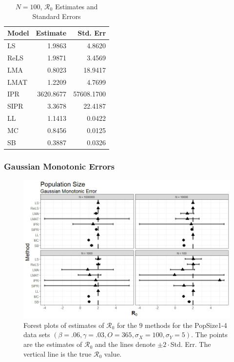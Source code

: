 \documentclass[12pt]{article}
\newcommand{\xxsir}{\ensuremath{9} } %
\newcommand{\rr}{\ensuremath{\mathcal{R}_0}}
\begin{document}
\begin{table}[H]
	
	\centering
	\begin{tabular}[t]{l|r|r}
		\hline
		Model & Estimate & Std. Err\\
		\hline
		LS & 1.9863 & 4.8620\\
		\hline
		ReLS & 1.9871 & 3.4569\\
		\hline
		LMA & 0.8023 & 18.9417\\
		\hline
		LMAT & 1.2209 & 4.7699\\
		\hline
		IPR & 3620.8677 & 57608.1700\\
		\hline
		SIPR & 3.3678 & 22.4187\\
		\hline
		LL & 1.1413 & 0.0422\\
		\hline
		MC & 0.8456 & 0.0125\\
		\hline
		SB & 0.3887 & 0.0326\\
		\hline
	\end{tabular}
\caption{$N = 100$, $\rr$ Estimates and Standard Errors}\label{tab:n2-res2}
\end{table}

\subsubsection{Gaussian Monotonic Errors}

\begin{figure}[H]
	\centering
	\includegraphics[scale=0.5]{images/popsize_nm.jpeg}
	\caption{Forest plots of estimates of $\rr$ for the \xxsir methods for the PopSize1-4 data sets $(\beta=.06, \gamma=.03, O=365, \sigma_X=100, \sigma_Y=5)$.  The points are the estimates of $\rr$ and the lines denote $\pm 2\cdot $Std. Err.  The vertical line is the true $\rr$ value.}
\end{figure}
\end{document}

